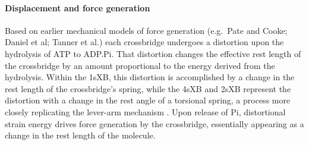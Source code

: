 \documentclass[]{article}
\begin{document}
\paragraph{Displacement and force generation} %
Based on earlier mechanical models of force generation (e.g.\ Pate and Cooke; Daniel et al; Tanner et al.) each crossbridge undergoes a distortion upon the hydrolysis of ATP to ADP.Pi.  
That distortion changes the effective rest length of the crossbridge by an amount proportional to the energy derived from the hydrolysis.  
Within the 1sXB, this distortion is accomplished by a change in the rest length of the crossbridge's spring, while the 4sXB and 2sXB represent the distortion with a change in the rest angle of a torsional spring, a process more closely replicating the lever-arm mechanism \citep{Reedy:2000p2620}.
Upon release of Pi, distortional strain energy drives force generation by the crossbridge, essentially appearing as a change in the rest length of the molecule.
\end{document}
